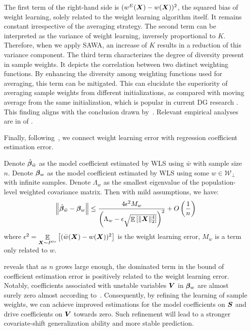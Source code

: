 The first term of the right-hand side is $(w^E(\boldsymbol{X})-w(\boldsymbol{X}))^2$, the squared bias of weight learning, solely related to the weight learning algorithm itself. It remains constant irrespective of the averaging strategy. 
The second term can be interpreted as the variance of weight learning, inversely proportional to $K$. Therefore, when we apply SAWA, an increase of $K$ results in a reduction of this variance component. 
The third term characterizes the degree of diversity present in sample weights. It depicts the correlation between two distinct weighting functions. By enhancing the diversity among weighting functions used for averaging, this term can be mitigated. This can elucidate the superiority of averaging sample weights from different initializations, as compared with moving average from the same initialization, which is popular in current DG research \citep{cha2021swad,arpit2022ensemble}. This finding aligns with the conclusion drawn by~\citet{rame2022diverse}. Relevant empirical analyses are in  of . 



Finally, following~\citet{xu2021stable}, we connect weight learning error with regression coefficient estimation error. 
\begin{proposition}
    Denote $\hat{\boldsymbol{\beta}}_{\bar{w}}$ as the model coefficient estimated by WLS using $\bar{w}$ with sample size $n$. 
    Denote $\boldsymbol{\beta}_w$ as the model coefficient estimated by WLS using some $w\in \mathcal{W}_{\perp}$ with infinite samples. 
    Denote $\Lambda_w$ as the smallest eigenvalue of the population-level weighted covariance matrix. 
    Then with mild assumptions, we have:
    \begin{equation}
        \left\|\hat{\boldsymbol{\beta}}_{\bar{w}}-\boldsymbol{\beta}_w\right\|\leq \frac{4\epsilon^2 M_w}{\left(\Lambda_w-\epsilon\sqrt{\mathop{\mathbb{E}}\limits_{}\left [\|\boldsymbol{X}\|_2^4\right]}\right)^2}+O\left(\frac1n\right)
    \end{equation}
    where $\epsilon^2=\mathop{\mathbb{E}}\limits_{\boldsymbol{X}\sim P^{tr}}\left [(\bar{w}(\boldsymbol{X})-w(\boldsymbol{X}))^2\right]$ is the weight learning error, $M_w$ is a term only related to $w$. 
\label{prop:error}
\end{proposition}
 reveals that as $n$ grows large enough, the dominated term in the bound of coefficient estimation error is positively related to the weight learning error. 
Notably, coefficients associated with unstable variables $\boldsymbol{V}$ in $\boldsymbol{\beta}_w$ are almost surely zero almost according to~\citet{xu2021stable}. 
Consequently, by refining the learning of sample weights, we can achieve improved estimations for the model coefficients on $\boldsymbol{S}$ and drive coefficients on $\boldsymbol{V}$ towards zero. Such refinement will lead to a stronger covariate-shift generalization ability and more stable prediction. 


